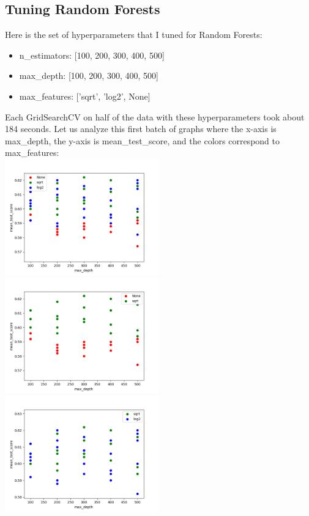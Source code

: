 \documentclass[12pt]{article}
\begin{document}
\subsection{Tuning Random Forests}
Here is the set of hyperparameters that I tuned for Random Forests:
\begin{itemize}
    \item n\_estimators: [100, 200, 300, 400, 500]
    \item max\_depth: [100, 200, 300, 400, 500]
    \item max\_features: ['sqrt', 'log2', None]
\end{itemize}
Each GridSearchCV on half of the data with these hyperparameters took about 184 seconds.
Let us analyze this first batch of graphs where the x-axis is max\_depth, the y-axis is mean\_test\_score, and the colors correspond to max\_features: \\
\includegraphics[width=0.5\textwidth]{RF_max_depth0.png}
\includegraphics[width=0.5\textwidth]{RF_max_depth1.png}
\includegraphics[width=0.5\textwidth]{RF_max_depth2.png}
\end{document}
